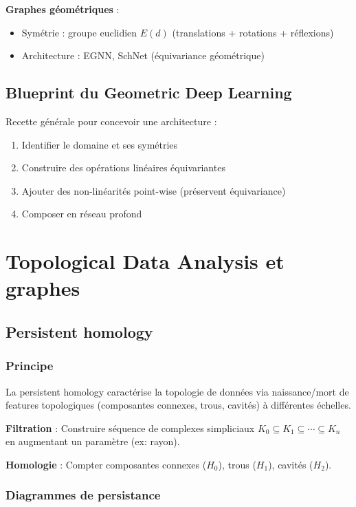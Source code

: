 \textbf{Graphes géométriques} :
\begin{itemize}
    \item Symétrie : groupe euclidien $E(d)$ (translations + rotations + réflexions)
    \item Architecture : EGNN, SchNet (équivariance géométrique)
\end{itemize}

\subsection{Blueprint du Geometric Deep Learning}

Recette générale pour concevoir une architecture :
\begin{enumerate}
    \item Identifier le domaine et ses symétries
    \item Construire des opérations linéaires équivariantes
    \item Ajouter des non-linéarités point-wise (préservent équivariance)
    \item Composer en réseau profond
\end{enumerate}

\section{Topological Data Analysis et graphes}

\subsection{Persistent homology}

\subsubsection{Principe}

La persistent homology caractérise la topologie de données via naissance/mort de features topologiques (composantes connexes, trous, cavités) à différentes échelles.

\textbf{Filtration} : Construire séquence de complexes simpliciaux $K_0 \subseteq K_1 \subseteq \cdots \subseteq K_n$ en augmentant un paramètre (ex: rayon).

\textbf{Homologie} : Compter composantes connexes ($H_0$), trous ($H_1$), cavités ($H_2$).

\subsubsection{Diagrammes de persistance}

